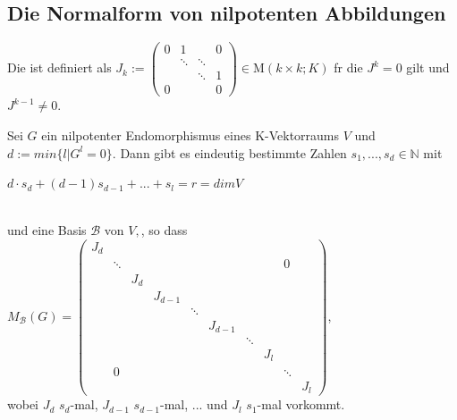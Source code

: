 \documentclass[11pt, a4paper]{article}
\begin{document}
\subsection{Die Normalform von nilpotenten Abbildungen}
\begin{definition}
Die  ist definiert als $J_{k}:=\left(\begin{array}{cccc}
{0} & {1} & {} & {0} 
\\ {} & {\ddots} & {\ddots} & {} 
\\ {} & {} & {\ddots} & {1} 
\\ {0} & {} & {} & {0}\end{array}\right) \in \mathrm{M}(k \times k ; K)$ f\uee r die $J^k = 0$ gilt und $J^{k-1} \neq 0$.
\end{definition}
\begin{theorem}
Sei $G$ ein nilpotenter Endomorphismus eines K-Vektorraums $V$ und $d := min \{l | G^l = 0 \}$. Dann gibt es eindeutig bestimmte Zahlen $s_1, ..., s_d \in \mathbb{N}$ mit 
\\ \centerline{$d \cdot s_d +(d - 1)s_{d-1} + ... + s_l = r = dim V$}
\\und eine Basis $\mathcal{B}$ von $V,$, so dass 
$M_\mathcal{B}(G) =
\left( \begin{array}{cccccccccc}
{J_{d}} & {} & {} & {} & {} & {} & {} & {} & {} & {}
\\ {} & {\ddots} & {} & {} & {} & {} & {} & {} & {0} & {}
\\ {} & {} & {J_{d}} & {} & {} & {} & {} & {} & {} & {}
\\ {} & {} & {} & {J_{d-1}} & {} & {} & {} & {} & {} & {}
\\ {} & {} & {} & {} & {}\ddots & {} & {} & {} & {} & {}
\\ {} & {} & {} & {} & {} & {J_{d-1}} & {} & {} & {} & {}
\\ {} & {} & {} & {} & {} & {} & {\ddots} & {} & {} & {}
\\ {} & {} & {} & {} & {} & {} & {} & {J_{l}} & {} & {}
\\ {} & {0} & {} & {} & {} & {} & {} & {} & {\ddots} & {}
\\ {} & {} & {} & {} & {} & {} & {} & {} & {} & {J_{l}}
\end{array} 
\right)$,
\\wobei $J_d$ $s_d$-mal, $J_{d-1}$ $s_{d-1}$-mal, ... und $J_l$ $s_1$-mal vorkommt.
\end{theorem}
\end{document}
